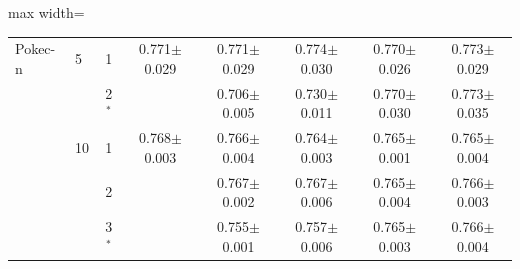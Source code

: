 \begin{table}[tbp]
\begin{adjustbox}{max width=\textwidth}
\begin{tabular}{llcccccc}
\midrule
Pokec-n & 5 & 1 & 0.771$\pm$0.029 & 0.771$\pm$0.029 & 0.774$\pm$0.030 & 0.770$\pm$0.026 & 0.773$\pm$0.029 \\
 &  & 2$^\ast$ &  & 0.706$\pm$0.005 & 0.730$\pm$0.011 & 0.770$\pm$0.030 & 0.773$\pm$0.035 \\
 & 10 & 1 & 0.768$\pm$0.003 & 0.766$\pm$0.004 & 0.764$\pm$0.003 & 0.765$\pm$0.001 & 0.765$\pm$0.004 \\
 &  & 2 &  & 0.767$\pm$0.002 & 0.767$\pm$0.006 & 0.765$\pm$0.004 & 0.766$\pm$0.003 \\
 &  & 3$^\ast$ &  & 0.755$\pm$0.001 & 0.757$\pm$0.006 & 0.765$\pm$0.003 & 0.766$\pm$0.004 \\
\bottomrule
\end{tabular}
\end{adjustbox}
\end{table}
